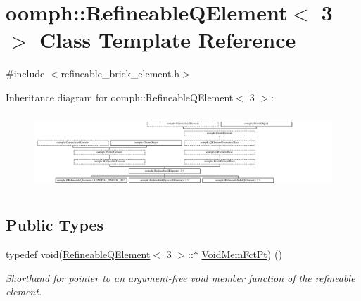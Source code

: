 \hypertarget{classoomph_1_1RefineableQElement_3_013_01_4}{}\section{oomph\+:\+:Refineable\+Q\+Element$<$ 3 $>$ Class Template Reference}
\label{classoomph_1_1RefineableQElement_3_013_01_4}


{\ttfamily \#include $<$refineable\+\_\+brick\+\_\+element.\+h$>$}

Inheritance diagram for oomph\+:\+:Refineable\+Q\+Element$<$ 3 $>$\+:\begin{figure}[H]
\begin{center}
\leavevmode
\includegraphics[height=2.873900cm]{classoomph_1_1RefineableQElement_3_013_01_4}
\end{center}
\end{figure}
\subsection*{Public Types}
\begin{DoxyCompactItemize}
\item 
typedef void(\hyperlink{classoomph_1_1RefineableQElement}{Refineable\+Q\+Element}$<$ 3 $>$\+::$\ast$ \hyperlink{classoomph_1_1RefineableQElement_3_013_01_4_ad23b3146537ecd540f79f485cc1d9e3f}{Void\+Mem\+Fct\+Pt}) ()
\begin{DoxyCompactList}\small\item\em Shorthand for pointer to an argument-\/free void member function of the refineable element. \end{DoxyCompactList}\end{DoxyCompactItemize}
